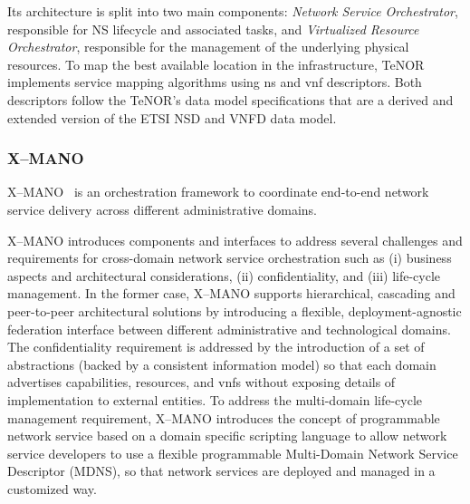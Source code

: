 Its architecture is split into two main components: \textit{Network Service Orchestrator}, responsible for NS lifecycle and associated tasks, and \textit{Virtualized Resource Orchestrator}, responsible for the management of the underlying physical resources. To map the best available location in the infrastructure, TeNOR implements service mapping algorithms using \gls{ns} and \gls{vnf} descriptors. Both descriptors follow the TeNOR's data model specifications that are a derived and extended version of the ETSI NSD and VNFD data model.


\subsubsection{X--MANO}
X--MANO~\cite{francescon2017x} is an orchestration framework to coordinate end-to-end network service delivery across different administrative domains. 

X--MANO introduces components and interfaces to address several challenges and requirements for cross-domain network service orchestration such as (i) business aspects and architectural considerations, (ii) confidentiality, and (iii) life-cycle management. In the former case,  X--MANO supports hierarchical, cascading and peer-to-peer architectural solutions by introducing a flexible, deployment-agnostic federation interface between different administrative and technological domains. The confidentiality requirement is addressed by the introduction of a set of abstractions (backed by a consistent information model) so that each domain advertises capabilities, resources, and \glspl{vnf} without exposing details of implementation to external entities. To address the multi-domain life-cycle management requirement, X--MANO introduces the concept of programmable network service based on a domain specific scripting language to allow network service developers to use a flexible programmable Multi-Domain Network Service Descriptor (MDNS), so that network services are deployed and managed in a customized way.



